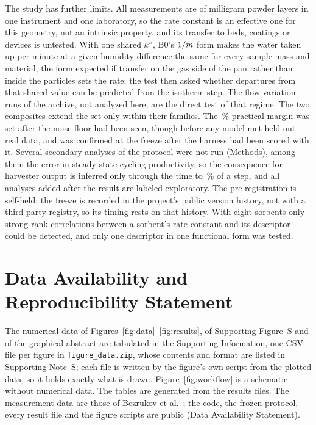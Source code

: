 \documentclass[12pt]{article}
\newcommand{\kpp}{k''}
\begin{document}
The study has further limits. All measurements are of milligram powder layers in one instrument and one laboratory,
so the rate constant is an effective one for this geometry, not an intrinsic property, and its transfer to beds,
coatings or devices is untested. With one shared $\kpp$, B0's $1/m$ form makes the water taken up per minute at a given
humidity difference the same for every sample mass and material, the form expected if transfer on the gas side of the
pan rather than inside the particles sets the rate; the test then asked whether departures from that shared value can
be predicted from the isotherm step. The flow-variation runs of the archive, not analyzed here, are the direct test of
that regime. The two composites extend the set only within their families. The \,\%
practical margin was set after the noise floor had been seen, though before any model met held-out real data, and was
confirmed at the freeze after the harness had been scored with it. Several secondary analyses of the protocol were not
run (Methods), among them the error in steady-state cycling productivity, so the consequence for harvester output is
inferred only through the time to \,\% of a step, and all analyses added after the result are labeled exploratory. The pre-registration is self-held:
the freeze is recorded in the project's public version history, not with a third-party registry, so its timing rests
on that history. With eight sorbents only strong rank correlations between a sorbent's rate constant and its
descriptor could be detected, and only one descriptor in one functional form was tested.

\section{Data Availability and Reproducibility Statement}

The numerical data of Figures~\ref{fig:data}--\ref{fig:results}, of Supporting Figure~S and of the graphical
abstract are tabulated in the Supporting Information, one CSV file per figure in \texttt{figure\_data.zip}, whose
contents and format are listed in Supporting Note~S; each file is written by the figure's own script from the
plotted data, so it holds exactly what is drawn. Figure~\ref{fig:workflow} is a schematic without numerical data. The
tables are generated from the results files. The measurement data are those of Bezrukov et
al.~\cite{Bezrukov2023Data}; the code, the frozen protocol, every result file and the figure scripts are public
(Data Availability Statement).
\end{document}
